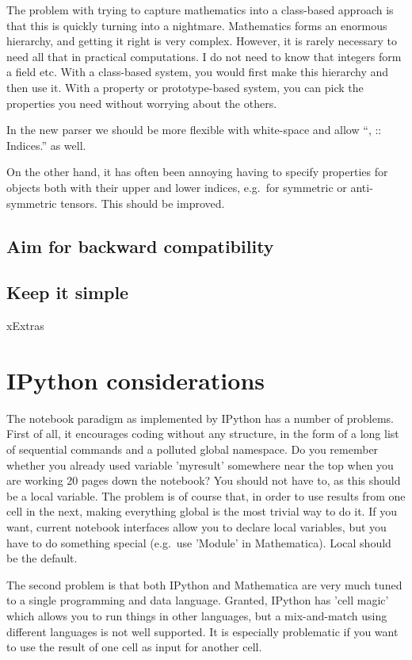 \documentclass[11pt]{article}
\begin{document}
The problem with trying to capture mathematics into a class-based
approach is that this is quickly turning into a nightmare. Mathematics
forms an enormous hierarchy, and getting it right is very
complex. However, it is rarely necessary to need all that in practical
computations. I do not need to know that integers form a field
etc. With a class-based system, you would first make this hierarchy
and then use it. With a property or prototype-based system, you can
pick the properties you need without worrying about the others.

In the new parser we should be more flexible with white-space and
allow ``{\mu,\nu} :: Indices.'' as well.


On the other hand, it has often been annoying having to specify
properties for objects both with their upper and lower indices,
e.g.~for symmetric or anti-symmetric tensors. This should be improved.


\subsection{Aim for backward compatibility}


\subsection{Keep it simple}


xExtras

\section{IPython considerations}

The notebook paradigm as implemented by IPython has a number of
problems. First of all, it encourages coding without any structure, in
the form of a long list of sequential commands and a polluted global
namespace. Do you remember whether you already used variable
'myresult' somewhere near the top when you are working 20 pages down
the notebook? You should not have to, as this should be a local
variable. The problem is of course that, in order to use results from
one cell in the next, making everything global is the most trivial way
to do it. If you want, current notebook interfaces allow you to
declare local variables, but you have to do something special
(e.g.~use 'Module' in Mathematica). Local should be the default.

The second problem is that both IPython and Mathematica are very much
tuned to a single programming and data language. Granted, IPython has
'cell magic' which allows you to run things in other languages, but a
mix-and-match using different languages is not well supported. It is
especially problematic if you want to use the result of one cell as
input for another cell.
\end{document}
